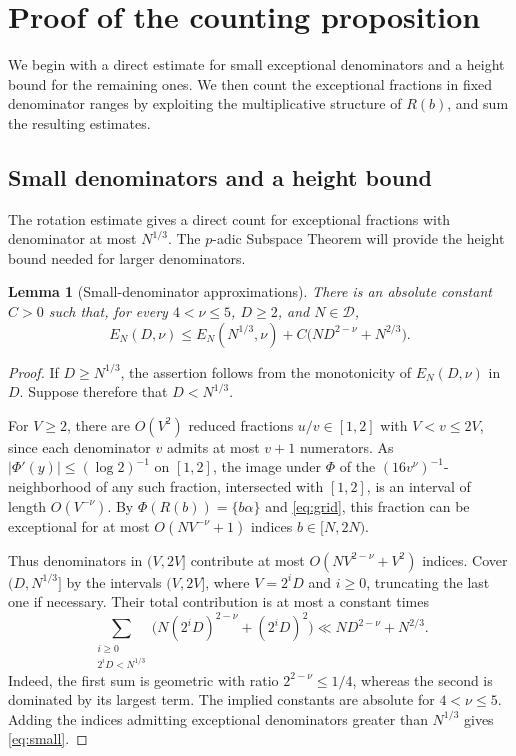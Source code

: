 \documentclass[11pt,reqno]{amsart}
\newtheorem{lemma}{Lemma}[section]
\theoremstyle{definition}
\newcommand{\DD}{\mathcal D}
\begin{document}
\section{Proof of the counting proposition}
\label{sec:count}

We begin with a direct estimate for small exceptional denominators
and a height bound for the remaining ones. We then count the
exceptional fractions in fixed denominator ranges by exploiting
the multiplicative structure of $R(b)$, and sum the resulting estimates.

\subsection{Small denominators and a height bound}

The rotation estimate gives a direct count for exceptional fractions
with denominator at most $N^{1/3}$. The $p$-adic Subspace Theorem
will provide the height bound needed for larger denominators.

\begin{lemma}[Small-denominator approximations]
\label{lem:small}
There is an absolute constant $C>0$ such that, for every
$4<\nu\le5$, $D\ge2$, and $N\in\DD$,
\begin{equation}\label{eq:small}
 E_N(D,\nu)\le E_N(N^{1/3},\nu)
 +C\bigl(ND^{2-\nu}+N^{2/3}\bigr).
\end{equation}
\end{lemma}

\begin{proof}
If $D\ge N^{1/3}$, the assertion follows from the
monotonicity of $E_N(D,\nu)$ in $D$. Suppose therefore
that $D<N^{1/3}$.

For $V\ge2$, there are $O(V^2)$ reduced fractions
$u/v\in[1,2]$ with $V<v\le2V$, since each denominator
$v$ admits at most $v+1$ numerators. As
$|\Phi'(y)|\le(\log2)^{-1}$ on $[1,2]$, the image
under $\Phi$ of the $(16v^\nu)^{-1}$-neighborhood of
any such fraction, intersected with $[1,2]$, is an
interval of length $O(V^{-\nu})$. By
$\Phi(R(b))=\{b\alpha\}$ and \eqref{eq:grid}, this
fraction can be exceptional for at most
$O(NV^{-\nu}+1)$ indices $b\in[N,2N)$.

Thus denominators in $(V,2V]$ contribute at most
$O(NV^{2-\nu}+V^2)$ indices. Cover $(D,N^{1/3}]$
by the intervals $(V,2V]$, where $V=2^iD$ and
$i\ge0$, truncating the last one if necessary.
Their total contribution is at most a constant times
\[
 \sum_{\substack{i\ge0\\2^iD<N^{1/3}}}
 \bigl(N(2^iD)^{2-\nu}+(2^iD)^2\bigr)
 \ll ND^{2-\nu}+N^{2/3}.
\]
Indeed, the first sum is geometric with ratio
$2^{2-\nu}\le1/4$, whereas the second is dominated
by its largest term. The implied constants are
absolute for $4<\nu\le5$. Adding the indices
admitting exceptional denominators greater than
$N^{1/3}$ gives \eqref{eq:small}.
\end{proof}
\end{document}

